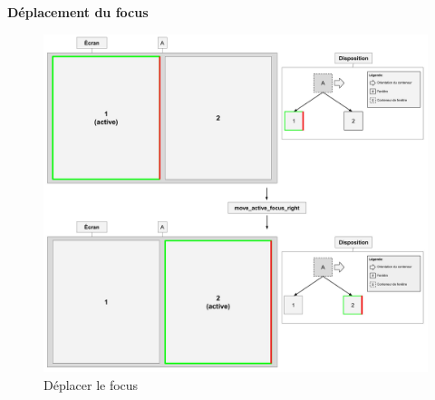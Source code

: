 \documentclass[titlepage]{article}
\begin{document}
\noindent\begin{minipage}{\linewidth}
\textbf{Déplacement du focus}
\begin{figure}[H]
	\centering
	\includegraphics[width=\textwidth]{move_active_focus_right.jpg}
	\caption{Déplacer le focus}
\end{figure}
\end{minipage}
\end{document}
